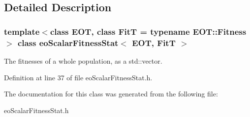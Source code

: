 \subsection{Detailed Description}
\subsubsection*{template$<$class EOT, class Fit\-T = typename EOT::Fitness$>$ class eo\-Scalar\-Fitness\-Stat$<$ EOT, Fit\-T $>$}

The fitnesses of a whole population, as a std::vector. 



Definition at line 37 of file eo\-Scalar\-Fitness\-Stat.h.

The documentation for this class was generated from the following file:\begin{CompactItemize}
\item 
eo\-Scalar\-Fitness\-Stat.h\end{CompactItemize}
